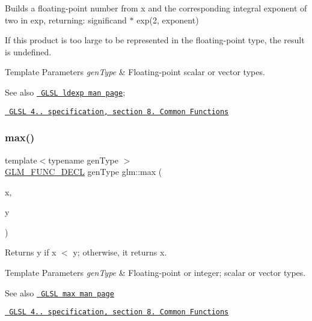 Builds a floating-\/point number from x and the corresponding integral exponent of two in exp, returning\+: significand $\ast$ exp(2, exponent)

If this product is too large to be represented in the floating-\/point type, the result is undefined.


\begin{DoxyTemplParams}{Template Parameters}
{\em gen\+Type} & Floating-\/point scalar or vector types.\\
\hline
\end{DoxyTemplParams}
\begin{DoxySeeAlso}{See also}
\href{http://www.opengl.org/sdk/docs/manglsl/xhtml/ldexp.xml}{\texttt{ G\+L\+SL ldexp man page}}; 

\href{http://www.opengl.org/registry/doc/GLSLangSpec.4.20.8.pdf}{\texttt{ G\+L\+SL 4.. specification, section 8. Common Functions}} 
\end{DoxySeeAlso}
\mbox{\label{group__core__func__common_ga98caa7f95a94c86a86ebce893a45326c}} 
\subsubsection{\texorpdfstring{max()}{max()}\hspace{0.1cm}{\footnotesize\ttfamily [1/3]}}
{\footnotesize\ttfamily template$<$typename gen\+Type $>$ \\
\mbox{\hyperlink{setup_8hpp_ab2d052de21a70539923e9bcbf6e83a51}{G\+L\+M\+\_\+\+F\+U\+N\+C\+\_\+\+D\+E\+CL}} gen\+Type glm\+::max (\begin{DoxyParamCaption}\item[{gen\+Type}]{x,  }\item[{gen\+Type}]{y }\end{DoxyParamCaption})}

Returns y if x $<$ y; otherwise, it returns x.


\begin{DoxyTemplParams}{Template Parameters}
{\em gen\+Type} & Floating-\/point or integer; scalar or vector types.\\
\hline
\end{DoxyTemplParams}
\begin{DoxySeeAlso}{See also}
\href{http://www.opengl.org/sdk/docs/manglsl/xhtml/max.xml}{\texttt{ G\+L\+SL max man page}} 

\href{http://www.opengl.org/registry/doc/GLSLangSpec.4.20.8.pdf}{\texttt{ G\+L\+SL 4.. specification, section 8. Common Functions}} 
\end{DoxySeeAlso}


